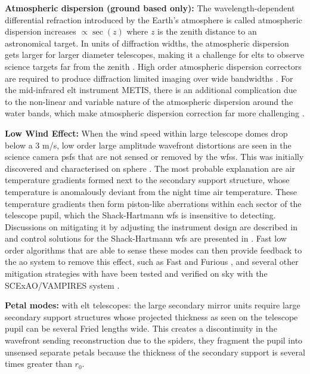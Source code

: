 \documentclass[letterpaper]{ar-1col}
\begin{document}
{\bf Atmospheric dispersion (ground based only):} The wavelength-dependent differential refraction introduced by the Earth's atmosphere is called atmospheric dispersion increases $\propto \sec(z)$ where $z$ is the zenith distance to an astronomical target.
%
In units of diffraction widths, the atmospheric dispersion gets larger for larger diameter telescopes, making it a challenge for \acp{elt} to observe science targets far from the zenith \citep{Kendrew08,Skemer09,van2020quantification}.
%
High order atmospheric dispersion correctors are required to produce diffraction limited imaging over wide bandwidths \citep{Kopon13}.
%
For the mid-infrared \ac{elt} instrument METIS, there is an additional complication due to the non-linear and variable nature of the atmospheric dispersion around the water bands, which make atmospheric dispersion correction far more challenging \citep{Absil22}.

{\bf Low Wind Effect: } When the wind speed within large telescope domes drop below a 3 m/s, low order large amplitude wavefront distortions are seen in the science camera \acp{psf} that are not sensed or removed by the \acp{wfs}.
%
This was initially discovered and characterised on \ac{sphere} \citep{Sauvage16}.
%
The most probable explanation are air temperature gradients formed next to the secondary support structure, whose temperature is anomalously deviant from the night time air temperature.
%
These temperature gradients then form piston-like aberrations within each sector of the telescope pupil, which the Shack-Hartmann \ac{wfs} is insensitive to detecting.
%
Discussions on mitigating it by adjusting the instrument design are described in \citet{Milli18} and control solutions for the Shack-Hartmann \ac{wfs} are presented in \citet{pourre2022low}.
%
Fast low order algorithms that are able to sense these modes can then provide feedback to the \ac{ao} system to remove this effect, such as Fast and Furious \citep{Wilby18}, and several other mitigation strategies with have been tested and verified on sky with the SCExAO/VAMPIRES system \citep{Vievard19}.

{\bf Petal modes: } with \ac{elt} telescopes: the large secondary mirror units require large secondary support structures whose projected thickness as seen on the telescope pupil can be several Fried lengths wide.
%
This creates a discontinuity in the wavefront sending reconstruction due to the spiders, they fragment the pupil into unsensed separate petals because the thickness of the secondary support is several times greater than $r_0$.
\end{document}
